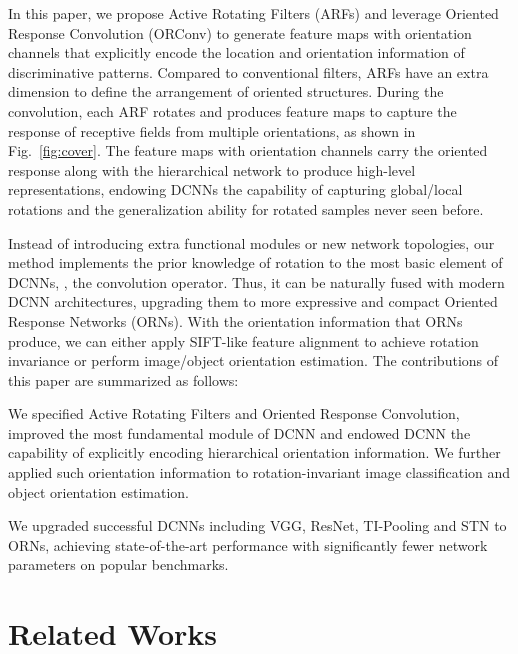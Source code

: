 \documentclass[10pt,twocolumn,letterpaper]{article}
\begin{document}
    In this paper, we propose Active Rotating Filters (ARFs) and leverage Oriented Response Convolution (ORConv) to generate feature maps with orientation channels that explicitly encode the location and orientation information of discriminative patterns. Compared to conventional filters, ARFs have an extra dimension to define the arrangement of oriented structures. During the convolution, each ARF rotates and produces feature maps to capture the response of receptive fields from multiple orientations, as shown in Fig.~\ref{fig:cover}. The feature maps with orientation channels carry the oriented response along with the hierarchical network to produce high-level representations, endowing DCNNs the capability of capturing global/local rotations and the generalization ability for rotated samples never seen before.

    Instead of introducing extra functional modules or new network topologies, our method implements the prior knowledge of rotation to the most basic element of DCNNs, \ie, the convolution operator. Thus, it can be naturally fused with modern DCNN architectures, upgrading them to more expressive and compact Oriented Response Networks (ORNs). With the orientation information that ORNs produce, we can either apply SIFT-like feature alignment to achieve rotation invariance or perform image/object orientation estimation. The contributions of this paper are summarized as follows:

    \begin{itemize*}
        \item We specified Active Rotating Filters and Oriented Response Convolution, improved the most fundamental module of DCNN and endowed DCNN the capability of explicitly encoding hierarchical orientation information. We further applied such orientation information to rotation-invariant image classification and object orientation estimation.

        \item We upgraded successful DCNNs including VGG, ResNet, TI-Pooling and STN to ORNs, achieving state-of-the-art performance with significantly fewer network parameters on popular benchmarks.
    \end{itemize*}

\section{Related Works}
\end{document}
